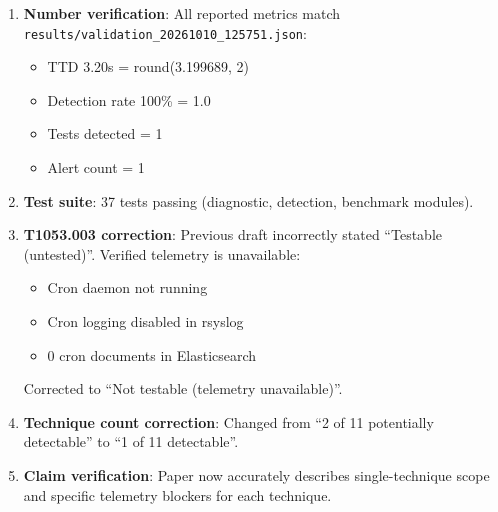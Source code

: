 \documentclass[11pt,a4paper]{article}
\begin{document}
\begin{enumerate}
    \item \textbf{Number verification}: All reported metrics match \texttt{results/validation\_20261010\_125751.json}:
    \begin{itemize}
        \item TTD 3.20s = round(3.199689, 2) \checkmark
        \item Detection rate 100\% = 1.0 \checkmark
        \item Tests detected = 1 \checkmark
        \item Alert count = 1 \checkmark
    \end{itemize}

    \item \textbf{Test suite}: 37 tests passing (diagnostic, detection, benchmark modules).

    \item \textbf{T1053.003 correction}: Previous draft incorrectly stated ``Testable (untested)''. Verified telemetry is unavailable:
    \begin{itemize}
        \item Cron daemon not running
        \item Cron logging disabled in rsyslog
        \item 0 cron documents in Elasticsearch
    \end{itemize}
    Corrected to ``Not testable (telemetry unavailable)''.

    \item \textbf{Technique count correction}: Changed from ``2 of 11 potentially detectable'' to ``1 of 11 detectable''.

    \item \textbf{Claim verification}: Paper now accurately describes single-technique scope and specific telemetry blockers for each technique.
\end{enumerate}
\end{document}
